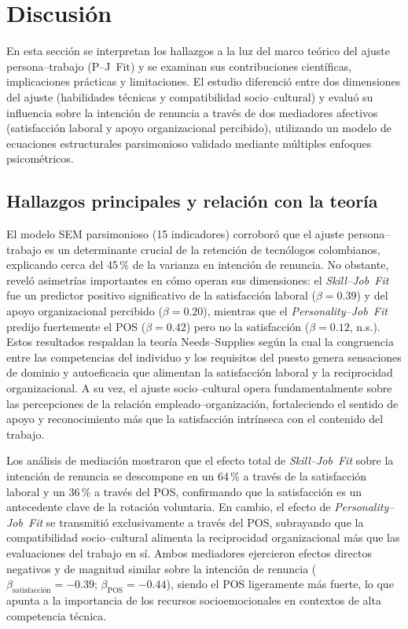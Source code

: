 \section{Discusión}

En esta sección se interpretan los hallazgos a la luz del marco teórico del ajuste persona–trabajo (P–J Fit) y se examinan sus contribuciones científicas, implicaciones prácticas y limitaciones. El estudio diferenció entre dos dimensiones del ajuste (habilidades técnicas y compatibilidad socio–cultural) y evaluó su influencia sobre la intención de renuncia a través de dos mediadores afectivos (satisfacción laboral y apoyo organizacional percibido), utilizando un modelo de ecuaciones estructurales parsimonioso validado mediante múltiples enfoques psicométricos.

\subsection{Hallazgos principales y relación con la teoría}

El modelo SEM parsimonioso (15 indicadores) corroboró que el ajuste persona–trabajo es un determinante crucial de la retención de tecnólogos colombianos, explicando cerca del 45\,\% de la varianza en intención de renuncia. No obstante, reveló asimetrías importantes en cómo operan sus dimensiones: el \emph{Skill--Job Fit} fue un predictor positivo significativo de la satisfacción laboral ($\beta=0.39$) y del apoyo organizacional percibido ($\beta=0.20$), mientras que el \emph{Personality--Job Fit} predijo fuertemente el POS ($\beta=0.42$) pero no la satisfacción ($\beta=0.12$, n.s.). Estos resultados respaldan la teoría Needs–Supplies según la cual la congruencia entre las competencias del individuo y los requisitos del puesto genera sensaciones de dominio y autoeficacia que alimentan la satisfacción laboral y la reciprocidad organizacional. A su vez, el ajuste socio–cultural opera fundamentalmente sobre las percepciones de la relación empleado–organización, fortaleciendo el sentido de apoyo y reconocimiento más que la satisfacción intrínseca con el contenido del trabajo.

Los análisis de mediación mostraron que el efecto total de \emph{Skill--Job Fit} sobre la intención de renuncia se descompone en un 64\,\% a través de la satisfacción laboral y un 36\,\% a través del POS, confirmando que la satisfacción es un antecedente clave de la rotación voluntaria. En cambio, el efecto de \emph{Personality--Job Fit} se transmitió exclusivamente a través del POS, subrayando que la compatibilidad socio–cultural alimenta la reciprocidad organizacional más que las evaluaciones del trabajo en sí. Ambos mediadores ejercieron efectos directos negativos y de magnitud similar sobre la intención de renuncia ($\beta_{\text{satisfacción}}=-0.39$; $\beta_{\text{POS}}=-0.44$), siendo el POS ligeramente más fuerte, lo que apunta a la importancia de los recursos socioemocionales en contextos de alta competencia técnica.

